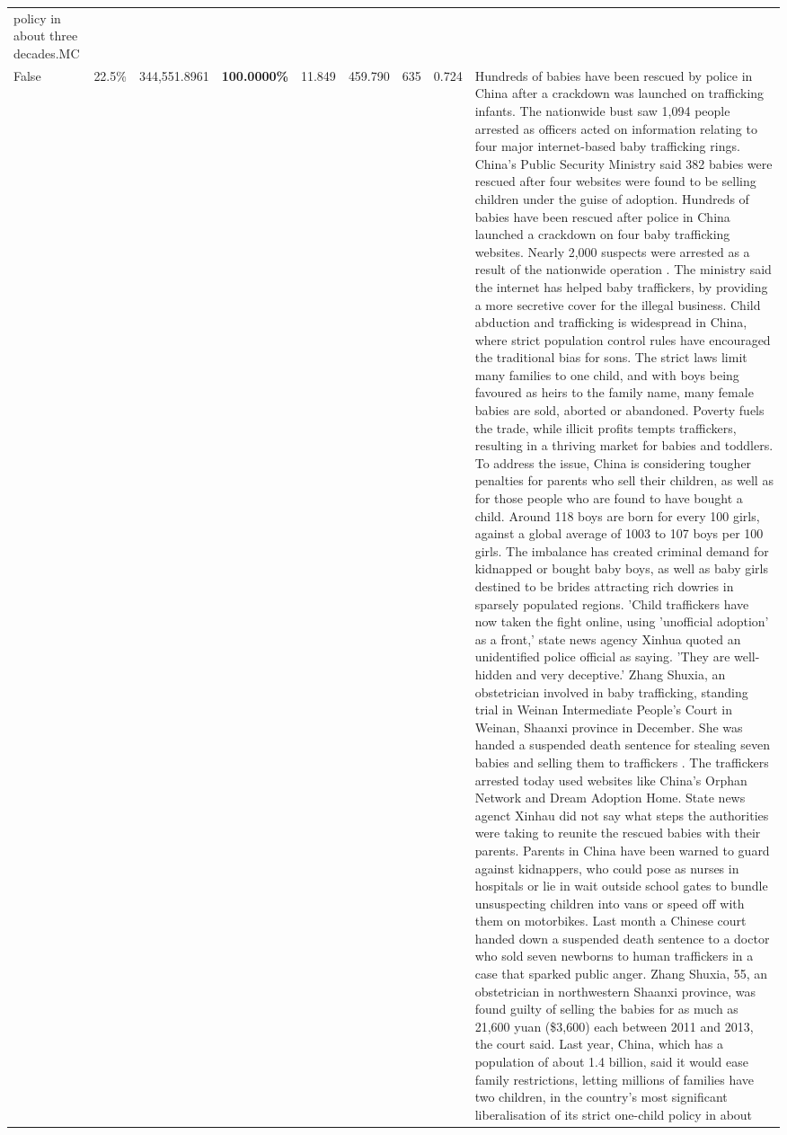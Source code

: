 \begin{table}[H]
\begin{tabular}{lllrlllll}
policy in about three decades.MC \\
\cline{1-9}
False & 22.5\% & 344,551.8961 & \bfseries \color{red} 100.0000\% & 11.849 & 459.790 & 635 & 0.724 & Hundreds of babies have been rescued by police in China after a crackdown was launched on trafficking infants. The nationwide bust saw 1,094 people arrested as officers acted on information relating to four major internet-based baby trafficking rings. China's Public Security Ministry said 382 babies were rescued after four websites were found to be selling children under the guise of adoption. Hundreds of babies have been rescued after police in China launched a crackdown on four baby trafficking websites. Nearly 2,000 suspects were arrested as a result of the nationwide operation . The ministry said the internet has helped baby traffickers, by providing a more secretive cover for the illegal business. Child abduction and trafficking is widespread in China, where strict population control rules have encouraged the traditional bias for sons. The strict laws limit many families to one child, and with boys being favoured as heirs to the family name, many female babies are sold, aborted or abandoned. Poverty fuels the trade, while illicit profits tempts traffickers, resulting in a thriving market for babies and toddlers. To address the issue, China is considering tougher penalties for parents who sell their children, as well as for those people who are found to have bought a child. Around 118 boys are born for every 100 girls, against a global average of 1003 to 107 boys per 100 girls. The imbalance has created criminal demand for kidnapped or bought baby boys, as well as baby girls destined to be brides attracting rich dowries in sparsely populated regions. 'Child traffickers have now taken the fight online, using 'unofficial adoption' as a front,' state news agency Xinhua quoted an unidentified police official as saying. 'They are well-hidden and very deceptive.' Zhang Shuxia, an obstetrician involved in baby trafficking, standing trial in Weinan Intermediate People's Court in Weinan, Shaanxi province in December. She was handed a suspended death sentence for stealing seven babies and selling them to traffickers . The traffickers arrested today used websites like China's Orphan Network and Dream Adoption Home. State news agenct Xinhau did not say what steps the authorities were taking to reunite the rescued babies with their parents. Parents in China have been warned to guard against kidnappers, who could pose as nurses in hospitals or lie in wait outside school gates to bundle unsuspecting children into vans or speed off with them on motorbikes. Last month a Chinese court handed down a suspended death sentence to a doctor who sold seven newborns to human traffickers in a case that sparked public anger. Zhang Shuxia, 55, an obstetrician in northwestern Shaanxi province, was found guilty of selling the babies for as much as 21,600 yuan (\$3,600) each between 2011 and 2013, the court said. Last year, China, which has a population of about 1.4 billion, said it would ease family restrictions, letting millions of families have two children, in the country's most significant liberalisation of its strict one-child policy in about 
\end{tabular}
\end{table}
